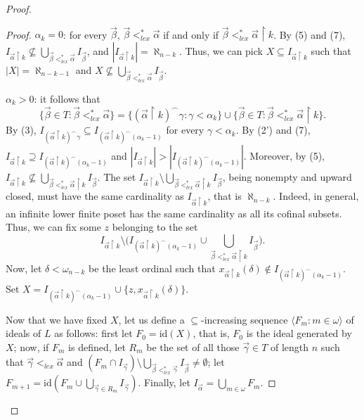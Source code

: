\documentclass[]{amsart}
\theoremstyle{definition}
\theoremstyle{remark}
\begin{document}
\begin{proof}
\begin{proof}
\noindent \underline{$\alpha_k = 0$}:  for every $\vec{\beta}$, $\vec{\beta} <^*_{lex} \vec{\alpha}$ if and only if $\vec{\beta} <^*_{lex} \vec{\alpha} \upharpoonright k$. By (5) and (7), $I_{\vec{\alpha} \upharpoonright k} \nsubseteq \bigcup_{\vec{\beta} <^*_{lex} \vec{\alpha}}I_{\vec{\beta}}$, and $|I_{\vec{\alpha} \upharpoonright k}| = \aleph_{n-k}$. Thus, we can pick $X\subseteq I_{\vec{\alpha} \upharpoonright k}$ such that $|X| = \aleph_{n-k-1}$ and  $X \nsubseteq \bigcup_{\vec{\beta} <^*_{lex} \vec{\alpha}} I_{\vec{\beta}}$. \vspace{0.5em}

\noindent \underline{$\alpha_k > 0$}: it follows that 
\[
\{\vec{\beta} \in T : \vec{\beta} <^*_{lex} \vec{\alpha}\} = \{(\vec{\alpha} \upharpoonright k)^\smallfrown \gamma : \gamma < \alpha_k\} \cup \{\vec{\beta} \in T : \vec{\beta} <^*_{lex} \vec{\alpha}\upharpoonright k\}.
\]
 By (3), $I_{(\vec{\alpha} \upharpoonright k)^\smallfrown \gamma} \subseteq I_{(\vec{\alpha} \upharpoonright k)^\smallfrown (\alpha_k-1)}$ for every $\gamma < \alpha_k$. By (2') and (7), $I_{\vec{\alpha} \upharpoonright k} \supseteq I_{(\vec{\alpha} \upharpoonright k)^\smallfrown (\alpha_k - 1)}$ and $|I_{\vec{\alpha} \upharpoonright k}| > |I_{(\vec{\alpha} \upharpoonright k)^\smallfrown (\alpha_k - 1)}|$. Moreover, by (5), $I_{\vec{\alpha} \upharpoonright k} \nsubseteq \bigcup_{\vec{\beta} <^*_{lex} \vec{\alpha} \upharpoonright k} I_{\vec{\beta}}$. The set $I_{\vec{\alpha} \upharpoonright k} \setminus \bigcup_{\vec{\beta} <^*_{lex} \vec{\alpha} \upharpoonright k} I_{\vec{\beta}}$, being nonempty and upward closed, must have the same cardinality as $I_{\vec{\alpha} \upharpoonright k}$, that is $\aleph_{n-k}$. Indeed, in general, an infinite lower finite poset has the same cardinality as all its cofinal subsets. Thus, we can fix some $z$ belonging to the set
\[
I_{\vec{\alpha} \upharpoonright k} \setminus \Big ( I_{(\vec{\alpha} \upharpoonright k)^\smallfrown (\alpha_k - 1)} \cup \bigcup_{\vec{\beta} <^*_{lex} \vec{\alpha} \upharpoonright k} I_{\vec{\beta}} \Big).
\] 
Now, let $\delta < \omega_{n-k}$ be the least ordinal such that $
x_{\vec{\alpha} \upharpoonright k}(\delta) \not\in I_{(\vec{\alpha} \upharpoonright k)^\smallfrown (\alpha_k - 1)}$.
Set $X = I_{(\vec{\alpha} \upharpoonright k)^\smallfrown (\alpha_k - 1)} \cup \{z, x_{\vec{\alpha} \upharpoonright k}(\delta)\}$.\vspace{0.5em}


 Now that we have fixed $X$, let us define a $\subseteq$-increasing sequence $\langle F_m : m\in\omega\rangle$ of ideals of $L$ as follows: first let $F_0 = \mathrm{id}(X)$,  that is, $F_0$ is the ideal generated by $X$; now, if $F_m$ is defined, let $R_m$ be the set of all those $\vec{\gamma} \in T$ of length $n$ such that $\vec{\gamma} <_{lex} \vec{\alpha}$ and $(F_m \cap I_{\vec{\gamma}}) \setminus \bigcup_{\vec{\beta} <^*_{lex} \vec{\gamma}} I_{\vec{\beta}} \neq \emptyset$; let $F_{m+1} = \mathrm{id}(F_m \cup \bigcup_{\vec{\gamma} \in R_m} I_{\vec{\gamma}})$. Finally, let $I_{\vec{\alpha}} = \bigcup_{m\in\omega} F_m$. 
 

\end{proof}
\end{proof}
\end{document}
